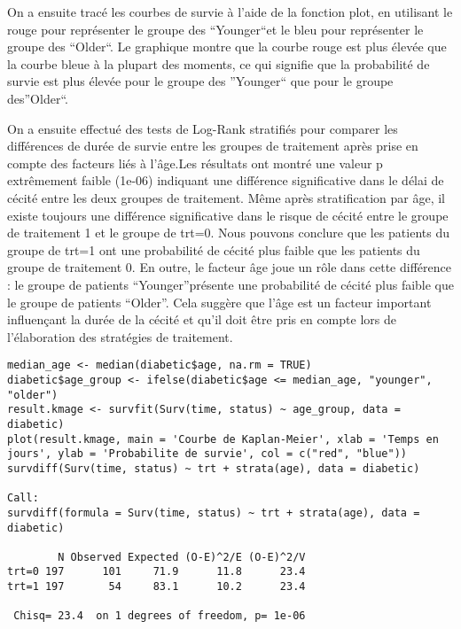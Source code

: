 \documentclass[../main.tex]{subfiles}
\begin{document}
\begin{CJK*}{UTF8}{gbsn}
On a ensuite tracé les courbes de survie à l'aide de la fonction plot, en utilisant le rouge pour représenter le groupe des “Younger“et le bleu pour représenter le groupe des “Older“. Le graphique montre que la courbe rouge est plus élevée que la courbe bleue à la plupart des moments, ce qui signifie que la probabilité de survie est plus élevée pour le groupe des ”Younger“ que pour le groupe des”Older“. 

On a ensuite effectué des tests de Log-Rank stratifiés pour comparer les différences de durée de survie entre les groupes de traitement après prise en compte des facteurs liés à l'âge.Les résultats ont montré une valeur p extrêmement faible (1e-06) indiquant une différence significative dans le délai de cécité entre les deux groupes de traitement. Même après stratification par âge, il existe toujours une différence significative dans le risque de cécité entre le groupe de traitement 1 et le groupe de trt=0. Nous pouvons conclure que les patients du groupe de trt=1 ont une probabilité de cécité plus faible que les patients du groupe de traitement 0. En outre, le facteur âge joue un rôle dans cette différence : le groupe de patients “Younger”présente une probabilité de cécité plus faible que le groupe de patients “Older”. Cela suggère que l'âge est un facteur important influençant la durée de la cécité et qu'il doit être pris en compte lors de l'élaboration des stratégies de traitement.
\begin{lstlisting}
median_age <- median(diabetic$age, na.rm = TRUE)
diabetic$age_group <- ifelse(diabetic$age <= median_age, "younger", "older")
result.kmage <- survfit(Surv(time, status) ~ age_group, data = diabetic)
plot(result.kmage, main = 'Courbe de Kaplan-Meier', xlab = 'Temps en jours', ylab = 'Probabilite de survie', col = c("red", "blue"))
survdiff(Surv(time, status) ~ trt + strata(age), data = diabetic)

Call:
survdiff(formula = Surv(time, status) ~ trt + strata(age), data = diabetic)

        N Observed Expected (O-E)^2/E (O-E)^2/V
trt=0 197      101     71.9      11.8      23.4
trt=1 197       54     83.1      10.2      23.4

 Chisq= 23.4  on 1 degrees of freedom, p= 1e-06
\end{lstlisting}


\end{CJK*}
\end{document}
